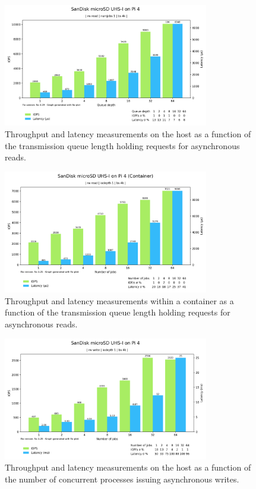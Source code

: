 \begin{figure}[H]
    \centering
    \includegraphics[width=0.8\textwidth]{images/results/sandisk-host-libaio-read-queue-depth-iops-latency.png}
    \caption{Throughput and latency measurements on the host as a function of the transmission queue length holding requests for asynchronous reads.}
    \label{images:fundamentals/net-ns-veth-arch.jpg}
\end{figure}

\begin{figure}[H]
    \centering
    \includegraphics[width=0.8\textwidth]{images/results/sandisk-libaio-read-numjobs-iops-latency.png}
    \caption{Throughput and latency measurements within a container as a function of the transmission queue length holding requests for asynchronous reads.}
    \label{images:fundamentals/net-ns-veth-arch.jpg}
\end{figure}

\begin{figure}[H]
    \centering
    \includegraphics[width=0.8\textwidth]{images/results/sandisk-host-libaio-write-numjobs-iops-latency.png}
    \caption{Throughput and latency measurements on the host as a function of the number of concurrent processes issuing asynchronous writes.}
    \label{images:fundamentals/net-ns-veth-arch.jpg}
\end{figure}

